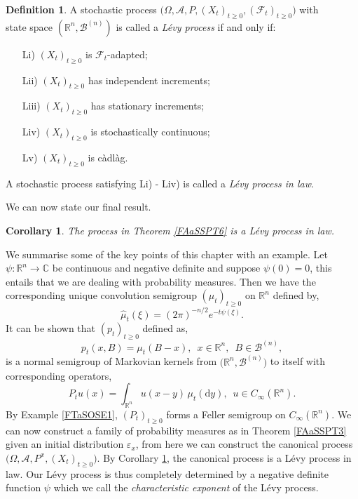 \documentclass[a4paper, 12pt]{report}
\newtheorem{corollary}[theorem]{Corollary}
\theoremstyle{remark}
\theoremstyle{definition}
\newtheorem{definition}[theorem]{Definition}
\begin{document}
\begin{definition}
A stochastic process $\big(\Omega, \mathcal{A}, P, (X_t)_{t \ge 0}, (\mathcal{F}_t)_{t \ge 0}\big)$ with\\
state space $(\mathbb{R}^n, \mathcal{B}^{(n)})$ is called a \emph{L\'evy process} if and only if:
\begin{itemize}
\item[Li)] $(X_t)_{t \ge 0}$ is $\mathcal{F}_t$-adapted;

\item[Lii)] $(X_t)_{t \ge 0}$ has independent increments;

\item[Liii)] $(X_t)_{t \ge 0}$ has stationary increments;

\item[Liv)] $(X_t)_{t \ge 0}$ is stochastically continuous;

\item[Lv)] $(X_t)_{t \ge 0}$ is c\`adl\`ag.
\end{itemize}
A stochastic process satisfying Li) - Liv) is called a \emph{L\'evy process in law}.
\end{definition}

We can now state our final result.

\begin{corollary}\label{FAaSSPC6}
The process in Theorem \ref{FAaSSPT6} is a L\'evy process in law.
\end{corollary}

We summarise some of the key points of this chapter with an example.  Let $\psi : \mathbb{R}^n \to \mathbb{C}$ be continuous and negative definite and suppose $\psi(0) = 0$, this entails that we are dealing with probability measures.  Then we have the corresponding unique convolution semigroup $(\mu_t)_{t \ge 0}$ on $\mathbb{R}^n$ defined by,
$$
\hat{\mu}_t(\xi) = (2\pi)^{-n/2}e^{-t\psi(\xi)}.
$$
It can be shown that $(p_t)_{t \ge 0}$ defined as,
$$
p_t(x, B) = \mu_t(B - x), \,\,\, x \in \mathbb{R}^n, \,\,\, B \in \mathcal{B}^{(n)},
$$
is a normal semigroup of Markovian kernels from $\big(\mathbb{R}^n, \mathcal{B}^{(n)}\big)$ to itself with corresponding operators,
$$
P_tu(x) = \int_{\mathbb{R}^n}u(x - y)\,\mu_t(\mathrm{d}y), \,\,\, u \in C_\infty(\mathbb{R}^n).
$$
By Example \ref{FTaSOSE1}, $(P_t)_{t \ge 0}$ forms a Feller semigroup on $C_\infty(\mathbb{R}^n)$.  We can now construct a family of probability measures as in Theorem \ref{FAaSSPT3} given an initial distribution $\varepsilon_x$, from here we can construct the canonical process $\big(\Omega, \mathcal{A}, P^x, (X_t)_{t \ge 0}\big)$.  By Corollary \ref{FAaSSPC6}, the canonical process is a L\'evy process in law.  Our L\'evy process is thus completely determined by a negative definite function $\psi$ which we call the \emph{characteristic exponent} of the L\'evy process.
\end{document}

